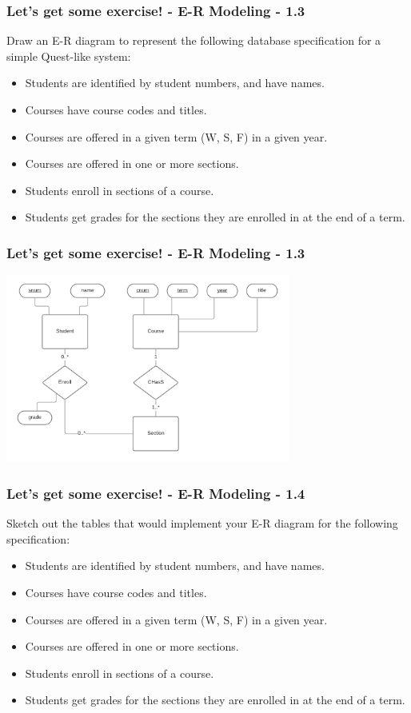 \begin{frame}
\frametitle{Let's get some exercise! - E-R Modeling - 1.3}

Draw an E-R diagram to represent the following database specification for a simple Quest-like system:\\
\begin{itemize}
  \item Students are identified by student numbers, and have names.
  \item Courses have course codes and titles.
  \item Courses are offered in a given term (W, S, F) in a given year.
  \item Courses are offered in one or more sections.
  \item Students enroll in sections of a course.
  \item Students get grades for the sections they are enrolled in at the end of a term.
\end{itemize}

\end{frame}


\begin{frame}
\frametitle{Let's get some exercise! - E-R Modeling - 1.3}

\begin{center}
  \includegraphics[width=0.7\textwidth]{images/1-3.png}
\end{center}


\end{frame}


\begin{frame}
\frametitle{Let's get some exercise! - E-R Modeling - 1.4}

Sketch out the tables that would implement your E-R diagram for the following specification:\\
\begin{itemize}
  \item Students are identified by student numbers, and have names.
  \item Courses have course codes and titles.
  \item Courses are offered in a given term (W, S, F) in a given year.
  \item Courses are offered in one or more sections.
  \item Students enroll in sections of a course.
  \item Students get grades for the sections they are enrolled in at the end of a term.
\end{itemize}

\end{frame}


